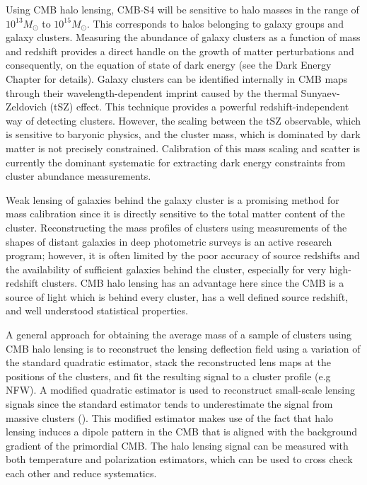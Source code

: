 Using CMB halo lensing, CMB-S4 will be sensitive to halo masses in the range of $10^{13} M_{\odot}$ to $10^{15} M_{\odot}$.  This corresponds to halos belonging to galaxy groups and galaxy clusters.  Measuring the abundance of galaxy clusters as a function of mass and redshift provides a direct handle on the growth of matter perturbations and consequently, on the equation of state of dark energy (see the Dark Energy Chapter for details).  Galaxy clusters can be identified internally in CMB maps through their wavelength-dependent imprint caused by the thermal Sunyaev-Zeldovich (tSZ) effect.  This technique provides a powerful redshift-independent way of detecting clusters. However, the scaling between the tSZ observable, which is sensitive to baryonic physics, and the cluster mass, which is dominated by dark matter is not precisely constrained.  Calibration of this mass scaling and scatter is currently the dominant systematic for extracting dark energy constraints from cluster abundance measurements. 

Weak lensing of galaxies behind the galaxy cluster is a promising method for mass calibration since it is directly sensitive to the total matter content of the cluster.  Reconstructing the mass profiles of clusters using measurements of the shapes of distant galaxies in deep photometric surveys is an active research program; however, it is often limited by the poor accuracy of source redshifts and the availability of sufficient galaxies behind the cluster, especially for very high-redshift clusters. CMB halo lensing has an advantage here since the CMB is a source of light which is behind every cluster, has a well defined source redshift, and well understood statistical properties.  

A general approach for obtaining the average mass of a sample of clusters using CMB halo lensing is to reconstruct the lensing deflection field using a variation of the standard quadratic estimator, stack the reconstructed lens maps at the positions of the clusters, and fit the resulting signal to a cluster profile (e.g NFW). A modified quadratic estimator is used to reconstruct small-scale lensing signals since the standard estimator tends to underestimate the signal from massive clusters (\cite{Hu:2007bt}).  This modified estimator makes use of the fact that halo lensing induces a dipole pattern in the CMB that is aligned with the background gradient of the primordial CMB.  The halo lensing signal can be measured with both temperature and polarization estimators, which can be used to cross check each other and reduce systematics. 

